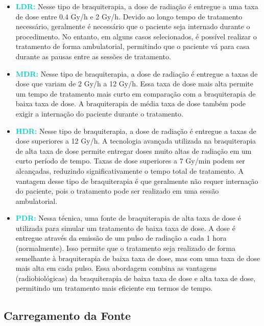 \documentclass[11pt,a4paper]{article}
\begin{document}
			\begin{itemize}
				\item \textcolor{DarkTurquoise}{\textbf{LDR:}}  Nesse tipo de braquiterapia, a dose de radiação é entregue a uma taxa de dose entre 0.4 Gy/h e 2 Gy/h. Devido ao longo tempo de tratamento necessário, geralmente é necessário que o paciente seja internado durante o procedimento. No entanto, em alguns casos selecionados, é possível realizar o tratamento de forma ambulatorial, permitindo que o paciente vá para casa durante as pausas entre as sessões de tratamento.
				
				\item \textcolor{DarkTurquoise}{\textbf{MDR:}} Nesse tipo de braquiterapia, a dose de radiação é entregue a taxas de dose que variam de 2 Gy/h a 12 Gy/h. Essa taxa de dose mais alta permite um tempo de tratamento mais curto em comparação com a braquiterapia de baixa taxa de dose. A braquiterapia de média taxa de dose também pode exigir a internação do paciente durante o tratamento.
				
				\item  \textcolor{DarkTurquoise}{\textbf{HDR:}}  Nesse tipo de braquiterapia, a dose de radiação é entregue a taxas de dose superiores a 12 Gy/h. A tecnologia avançada utilizada na braquiterapia de alta taxa de dose permite entregar doses muito altas de radiação em um curto período de tempo. Taxas de dose superiores a 7 Gy/min podem ser alcançadas, reduzindo significativamente o tempo total de tratamento. A vantagem desse tipo de braquiterapia é que geralmente não requer internação do paciente, pois o tratamento pode ser realizado em uma sessão ambulatorial.
				
				\item \textcolor{DarkTurquoise}{\textbf{PDR:}} Nessa técnica, uma fonte de braquiterapia de alta taxa de dose é utilizada para simular um tratamento de baixa taxa de dose. A dose é entregue através da emissão de um pulso de radiação a cada 1 hora (normalmente). Isso permite que o tratamento seja realizado de forma semelhante à braquiterapia de baixa taxa de dose, mas com uma taxa de dose mais alta em cada pulso. Essa abordagem combina as vantagens (radiobiológicas) da braquiterapia de baixa taxa de dose e alta taxa de dose, permitindo um tratamento mais eficiente em termos de tempo.
			\end{itemize}



		\subsection*{Carregamento da Fonte}
\end{document}
